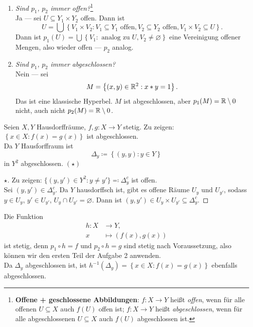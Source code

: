 \begin{problem*}[2]
\begin{enumerate}
    \item \emph{Sind $ p_1 $, $ p_2 $ immer offen?}\footnote{\textbf{Offene + geschlossene Abbildungen}: $ f: X \to Y $ heißt \emph{offen}, wenn für alle offenen $ U \subseteq X $ auch $ f(U) $ offen ist; $ f: X \to Y $ heißt \emph{abgeschlossen}, wenn für alle abgeschlossenen $ U \subseteq X $ auch $ f(U) $ abgeschlossen ist.} \\
      Ja --- sei $ U \subseteq Y_1 \times Y_2 $ offen. Dann ist
      \begin{equation*}
        U = \bigcup\left\{ V_1 \times V_2 : V_1 \subseteq Y_1 \text{ offen}, V_2 \subseteq Y_2 \text{ offen}, V_1 \times V_2 \subseteq U \right\}\text{.}
      \end{equation*}
      Dann ist $ p_1(U) = \bigcup\left\{ V_1 : \text{ analog zu } U, V_2 \neq \varnothing \right\} $ eine Vereinigung offener Mengen, also wieder offen --- $ p_2 $ analog.

    \item \emph{Sind $ p_1 $, $ p_2 $ immer abgeschlossen?} \\
      Nein --- sei
      \begin{equation*}
        M = \left\{ (x,y) \in \mathbb{R}^2 : x*y = 1 \right\}\text{.}
      \end{equation*}
      Das ist eine klassische Hyperbel. $ M $ ist abgeschlossen, aber $ p_1(M) = \mathbb{R} \setminus { 0 } $ nicht, auch nicht $ p_2(M) = \mathbb{R} \setminus { 0 } $.
  \end{enumerate}
\end{problem*}

\begin{problem*}[3]
  Seien $ X, Y $ Hausdorffräume, $ f,g : X \to Y $ stetig. Zu zeigen: $ \left\{ x \in X : f(x) = g(x) \right\} $ ist abgeschlossen. \\
  Da $ Y $ Hausforffraum ist
  \begin{equation*}
    \Delta_y \coloneqq \left\{ (y,y) : y \in Y \right\}
  \end{equation*}
  in $ Y^2 $ abgeschlossen. $ (\star) $
  \begin{proof}[$ \star $]
    Zu zeigen: $ \{ (y, y') \in Y^2 : y \neq y' \} \eqqcolon \Delta_y^c $ ist offen. \\
    Sei $ (y,y') \in \Delta_y^c $. Da $ Y $ hausdorffsch ist, gibt es offene Räume $ U_y $ und $ U_{y'} $, sodass $ y \in U_y $, $ y' \in U_{y'} $, $ U_y \cap U_{y'} = \varnothing $. Dann ist $ (y, y') \in U_y \times U_{y'} \subseteq \Delta_y^c $.
  \end{proof}
  Die Funktion
  \begin{align*}
    h : X &\to Y\text{,} \\
    x &\mapsto (f(x), g(x))
  \end{align*}
  ist stetig, denn $ p_1 \circ h = f $ und $ p_2 \circ h = g $ sind stetig nach Voraussetzung, also können wir den ersten Teil der Aufgabe 2 anwenden. \\
  Da $ \Delta_y $ abgeschlossen ist, ist $ h^{-1}(\Delta_y) = \left\{ x \in X : f(x) = g(x) \right\} $ ebenfalls abgeschlossen.
\end{problem*}

